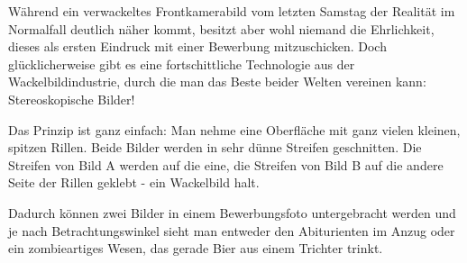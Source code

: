 \documentclass[a5paper,pagesize,10pt,bibtotoc,pointlessnumbers,normalheadings,DIV=9,twoside=false]{scrbook}
\begin{document}
Während ein verwackeltes Frontkamerabild vom letzten Samstag der Realität im Normalfall deutlich näher kommt, besitzt aber wohl niemand die Ehrlichkeit, dieses als ersten Eindruck mit einer Bewerbung mitzuschicken.
Doch glücklicherweise gibt es eine fortschittliche Technologie aus der Wackelbildindustrie, durch die man das Beste beider Welten vereinen kann:
Stereoskopische Bilder!

Das Prinzip ist ganz einfach:
Man nehme eine Oberfläche mit ganz vielen kleinen, spitzen Rillen.
Beide Bilder werden in sehr dünne Streifen geschnitten.
Die Streifen von Bild A werden auf die eine, die Streifen von Bild B auf die andere Seite der Rillen geklebt - ein Wackelbild halt.

Dadurch können zwei Bilder in einem Bewerbungsfoto untergebracht werden und je nach Betrachtungswinkel sieht man entweder den Abiturienten im Anzug oder ein zombieartiges Wesen, das gerade Bier aus einem Trichter trinkt.



\end{document}
